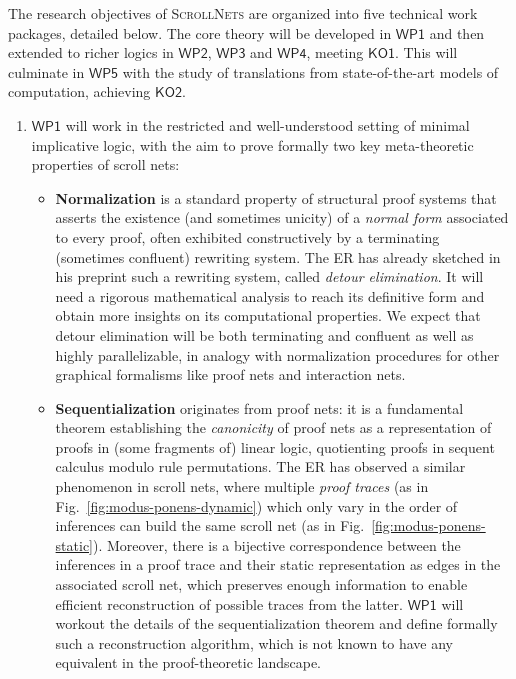 \documentclass[12pt,draftproposal]{msca-pf}
\newcommand{\proj}{\small\textsc{ScrollNets}}
\newcommand{\KO}[1]{$\mathsf{KO#1}$}
\newcommand{\WP}[1]{$\mathsf{WP#1}$}
\begin{document}
The research objectives of {\proj} are organized into five technical work packages, detailed below.
The core theory will be developed in \WP{1} and then extended to richer logics in \WP{2}, \WP{3} and
\WP{4}, meeting \KO{1}. This will culminate in \WP{5} with the study of translations from
state-of-the-art models of computation, achieving \KO{2}.
\begin{enumerate}
    \item \WP{1} will work in the restricted and well-understood setting of minimal implicative
    logic, with the aim to prove formally two key meta-theoretic properties of scroll nets:
    \begin{itemize}
        \item \textbf{Normalization} is a standard property of structural proof
        systems that asserts the existence (and sometimes unicity) of a \emph{normal form} associated to
        every proof, often exhibited constructively by a terminating (sometimes confluent) rewriting
        system. The ER has already sketched in his preprint such a rewriting system, called \emph{detour
        elimination}. It will need a rigorous mathematical analysis to reach its definitive form and
        obtain more insights on its computational properties. We expect that detour elimination will be
        both terminating and confluent as well as highly parallelizable, in analogy with normalization
        procedures for other graphical formalisms like proof nets and interaction nets.

        \item \textbf{Sequentialization} originates from proof nets: it is a fundamental theorem establishing the
        \emph{canonicity} of proof nets as a representation of proofs in (some fragments of) linear
        logic, quotienting proofs in sequent calculus modulo rule permutations. The ER has observed a
        similar phenomenon in scroll nets, where multiple \emph{proof traces} (as in
        Fig.~\ref{fig:modus-ponens-dynamic}) which only vary in the order of inferences can build the
        same scroll net (as in Fig.~\ref{fig:modus-ponens-static}). Moreover, there is a bijective
        correspondence between the inferences in a proof trace and their static representation as edges
        in the associated scroll net, which preserves enough information to enable efficient
        reconstruction of possible traces from the latter. \WP{1} will workout the details of the
        sequentialization theorem and define formally such a reconstruction algorithm, which is not
        known to have any equivalent in the proof-theoretic landscape.
    \end{itemize}
    

\end{enumerate}
\end{document}
